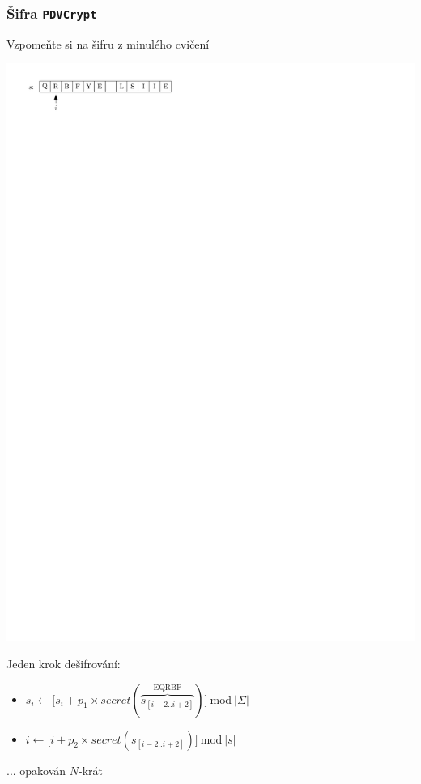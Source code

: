 \documentclass[usenames,dvipsnames,9pt]{beamer}
\begin{document}
{
\begin{frame}[fragile]
  \frametitle{Šifra \texttt{PDVCrypt}}
  Vzpomeňte si na šifru z minulého cvičení
  \begin{center}
    \includegraphics[scale=0.8]{figs/pdvcrypt.pdf}
  \end{center}

  {\small
  Jeden krok dešifrování:
  \vspace{-1em}
  \begin{itemize}
    \item $s_i \gets \Big[ s_i + p_1 \times secret(\overbrace{s_{[i-2 .. i+2]}}^{\text{EQRBF}}) \Big] \ \mathrm{mod}\ |\Sigma|$
    \item $i \gets \Big[ i + p_2 \times secret(s_{[i-2 .. i+2]}) \Big] \ \mathrm{mod} \ |s|$
  \end{itemize}
  ... opakován $N$-krát}

  \vspace{1em}
\end{frame}
}
\end{document}
